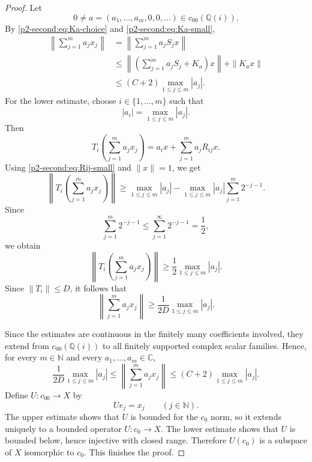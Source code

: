 \documentclass[11pt,reqno]{amsart}
\makeatletter
\theoremstyle{plain}
\theoremstyle{definition}
\newcommand{\N}{\mathbb N}
\newcommand{\C}{\mathbb C}
\newcounter{problempaper}
\newenvironment{problempaperbody}{%
  \setcounter{subsection}{0}%
  \setcounter{subsubsection}{0}%
  \setcounter{paragraph}{0}%
  \renewcommand{\thesubsection}{\arabic{subsection}}%
  \renewcommand{\thesubsubsection}{\thesubsection.\arabic{subsubsection}}%
  \renewcommand{\theparagraph}{\thesubsubsection.\arabic{paragraph}}%
  \let\problem@outersection\section
  \let\problem@outersubsection\subsection
  \let\problem@outersubsubsection\subsubsection
  \let\problem@outerparagraph\paragraph
  \let\section\problem@papersection
  \let\subsection\problem@papersubsection
  \let\subsubsection\problem@papersubsubsection
}{%
  \let\section\problem@outersection
  \let\subsection\problem@outersubsection
  \let\subsubsection\problem@outersubsubsection
  \let\paragraph\problem@outerparagraph
}
\newcommand{\problem@target}[2]{%
  \hypertarget{problem-\theproblempaper-#1-#2}{}%
}
\newcommand{\problem@paperheading}[3]{%
  \par\bigskip
  \problem@target{#1}{#2}%
  \noindent{\large\bfseries #2.\quad #3\par}%
  \nobreak\smallskip
}
\newcommand{\problem@papersubheading}[3]{%
  \par\medskip
  \problem@target{#1}{#2}%
  \noindent{\normalsize\bfseries #2.\quad #3\par}%
  \nobreak\smallskip
}
\newcommand{\problem@papersubsubheading}[3]{%
  \par\smallskip
  \problem@target{#1}{#2}%
  \noindent{\normalsize\itshape #2.\quad #3.\ }%
}
\def\problem@papersection{%
  \@ifstar{\problem@papersectionstar}{\problem@papersectionnostar}%
}
\def\problem@papersectionstar#1{%
  \par\bigskip\noindent{\large\bfseries #1\par}\nobreak\smallskip
}
\def\problem@papersectionnostar#1{%
  \refstepcounter{subsection}%
  \setcounter{subsubsection}{0}%
  \setcounter{paragraph}{0}%
  \problem@paperheading{section}{\thesubsection}{#1}%
  \problem@writecontentsline{section}{\thesubsection}{#1}%
}
\def\problem@papersubsection{%
  \@ifstar{\problem@papersubsectionstar}{\problem@papersubsectionnostar}%
}
\def\problem@papersubsectionstar#1{%
  \par\medskip\noindent{\normalsize\bfseries #1\par}\nobreak\smallskip
}
\def\problem@papersubsectionnostar#1{%
  \refstepcounter{subsubsection}%
  \setcounter{paragraph}{0}%
  \problem@papersubheading{subsection}{\thesubsubsection}{#1}%
  \problem@writecontentsline{subsection}{\thesubsubsection}{#1}%
}
\def\problem@papersubsubsection{%
  \@ifstar{\problem@papersubsubsectionstar}{\problem@papersubsubsectionnostar}%
}
\def\problem@papersubsubsectionstar#1{%
  \par\smallskip\noindent{\normalsize\itshape #1.\ }%
}
\def\problem@papersubsubsectionnostar#1{%
  \refstepcounter{paragraph}%
  \problem@papersubsubheading{subsubsection}{\theparagraph}{#1}%
  \problem@writecontentsline{subsubsection}{\theparagraph}{#1}%
}
\newcommand{\problem@writecontentsline}[3]{%
  \begingroup
  \protected@write\@auxout{}{%
    \string\problemcontentsentry{\theproblempaper}{#1}{#2}{#3}{\thepage}%
  }%
  \endgroup
}
\newcommand{\problemcontentsentry}[5]{%
  \@ifundefined{problemcontents@#1}{%
    \expandafter\gdef\csname problemcontents@#1\endcsname{}%
  }{}%
  \expandafter\g@addto@macro\csname problemcontents@#1\endcsname{%
    \problemcontentsline{#1}{#2}{#3}{#4}{#5}%
  }%
}
\newcommand{\problemcontentslink}[4]{%
  \hyperlink{problem-#1-#2-#3}{#4}%
}
\newcommand{\problemcontentsline}[5]{%
  \ifstrequal{#2}{section}{%
    \par\noindent
    \problemcontentslink{#1}{#2}{#3}{\makebox[2.5em][l]{#3}#4}%
    \nobreak\dotfill
    \problemcontentslink{#1}{#2}{#3}{#5}\par
  }{%
    \ifstrequal{#2}{subsection}{%
      \par\noindent\hspace*{1.5em}%
      \problemcontentslink{#1}{#2}{#3}{\makebox[3.5em][l]{#3}#4}%
      \nobreak\dotfill
      \problemcontentslink{#1}{#2}{#3}{#5}\par
    }{%
      \par\noindent\hspace*{3em}%
      \problemcontentslink{#1}{#2}{#3}{\makebox[4.5em][l]{#3}#4}%
      \nobreak\dotfill
      \problemcontentslink{#1}{#2}{#3}{#5}\par
    }%
  }%
}
\makeatother
\begin{document}
\begin{problempaperbody}
\begin{proof}
Let
\begin{equation*}
        0\ne a=(a_1,\ldots,a_m,0,0,\ldots)\in c_{00}(\mathbb Q(i)).
\end{equation*}
By \eqref{p2-second:eq:Ka-choice} and \eqref{p2-second:eq:Ka-small},
\begin{equation*}
\begin{aligned}
        \left\|\sum_{j=1}^{m}a_jx_j\right\|
        &=\left\|\sum_{j=1}^{m}a_jS_jx\right\|\\
        &\leq\left\|\left(\sum_{j=1}^{m}a_jS_j+K_a\right)x\right\|+\|K_ax\|\\
        &\leq (C+2)\max_{1\leq j\leq m}|a_j|.
\end{aligned}
\end{equation*}
For the lower estimate, choose $i\in\{1,\ldots,m\}$ such that
\begin{equation*}
        |a_i|=\max_{1\leq j\leq m}|a_j|.
\end{equation*}
Then
\begin{equation*}
        T_i\left(\sum_{j=1}^{m}a_jx_j\right)=a_ix+\sum_{j=1}^{m}a_jR_{ij}x.
\end{equation*}
Using \eqref{p2-second:eq:Rij-small} and $\|x\|=1$, we get
\begin{equation*}
        \left\|T_i\left(\sum_{j=1}^{m}a_jx_j\right)\right\|\geq \max_{1\leq j\leq m}|a_j|-\max_{1\leq j\leq m}|a_j|\sum_{j=1}^{m}2^{-j-1}.
\end{equation*}
Since
\begin{equation*}
        \sum_{j=1}^{m}2^{-j-1}\leq \sum_{j=1}^{\infty}2^{-j-1}=\frac12,
\end{equation*}
we obtain
\begin{equation*}
        \left\|T_i\left(\sum_{j=1}^{m}a_jx_j\right)\right\|\geq \frac12\max_{1\leq j\leq m}|a_j|.
\end{equation*}
Since $\|T_i\|\leq D$, it follows that
\begin{equation*}
        \left\|\sum_{j=1}^{m}a_jx_j\right\|\geq \frac{1}{2D}\max_{1\leq j\leq m}|a_j|.
\end{equation*}

Since the estimates are continuous in the finitely many coefficients involved, they extend from $c_{00}(\mathbb Q(i))$ to all finitely supported complex scalar families. Hence, for every $m\in\N$ and every $a_1,\ldots,a_m\in\C$,
\begin{equation*}
        \frac{1}{2D}\max_{1\leq j\leq m}|a_j|
        \leq
        \left\|\sum_{j=1}^{m}a_jx_j\right\|
        \leq
        (C+2)\max_{1\leq j\leq m}|a_j|.
\end{equation*}
Define $U:c_{00}\to X$ by
\begin{equation*}
        Ue_j=x_j \qquad(j\in\N).
\end{equation*}
The upper estimate shows that $U$ is bounded for the $c_0$ norm, so it extends uniquely to a bounded operator $U:c_0\to X$. The lower estimate shows that $U$ is bounded below, hence injective with closed range. Therefore $U(c_0)$ is a subspace of $X$ isomorphic to $c_0$. This finishes the proof.
\end{proof}


\end{problempaperbody}
\end{document}
